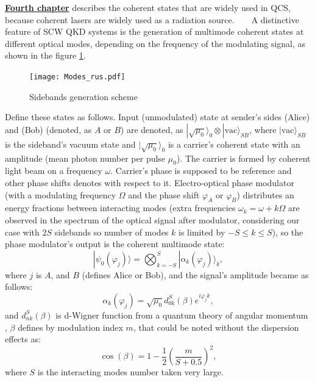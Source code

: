 
 \underline{\textbf{Fourth chapter}} describes the coherent states that are widely used in QCS, because coherent lasers are widely used as a radiation source.
 
  A distinctive feature of SCW QKD systems is the generation of multimode coherent states at different optical modes, depending on the frequency of the modulating signal, as shown in the figure \ref{fig:multimodes}. 

 \begin{figure}[ht]
  \centering
  \texttt{[image: Modes\_rus.pdf]}
  \caption{Sidebands generation scheme}
  \label{fig:multimodes}
\end{figure}


Define these states as follows. Input (unmodulated) state at sender's sides (Alice) and (Bob) (denoted, as $A$ or $B$) are denoted, as $|\sqrt{\mu_0}\rangle_0\otimes|\mathrm{vac}\rangle_{SB}$, where $|\mathrm{vac}\rangle_{SB}$ is the sideband's vacuum state and $|\sqrt{\mu_0}\rangle_0$ is a carrier's coherent state with an amplitude (mean photon number per pulse $\mu_0$). The carrier is formed by coherent light beam on a frequency $\omega$. Carrier's phase is supposed to be reference and other phase shifts denotes with respect to it. Electro-optical phase modulator (with a modulating frequency $\Omega$ and the phase shift $\varphi_A$ or $\varphi_B$) distributes an energy fractions between interacting modes (extra frequencies $\omega_k=\omega+k\Omega$ are observed in the spectrum of the optical signal after modulator, considering our case with $2S$ sidebands so number of modes $k$ is limited by $-S\le k\le S$), so the phase modulator's output is the coherent multimode state: 
%
\begin{equation}\label{phi}
|\psi_0(\varphi_j)\rangle = \bigotimes_{k=-S}^S|{\alpha_k(\varphi_j)}\rangle_k,
\end{equation}
%
where $j$ is  $A$, and $B$ (defines Alice or Bob), and the signal's amplitude became as follows: 
%
\begin{equation}\label{alpha}
\alpha_k(\varphi_j)=\sqrt{\mu_0}d^S_{0k}(\beta)e^{i\varphi_jk},
\end{equation}
%
and $d^S_{nk}(\beta)$ is d-Wigner function from a quantum theory of angular momentum  %
, $\beta$ defines by modulation index $m$, that could be noted without the dispersion effects as: 
%
\begin{equation}\label{betam}
\cos{({\beta})}=1-\frac{1}{2}{\left(\frac{m}{S+0.5}\right)^2},
\end{equation}
where $S$ is the interacting modes number taken very large.

